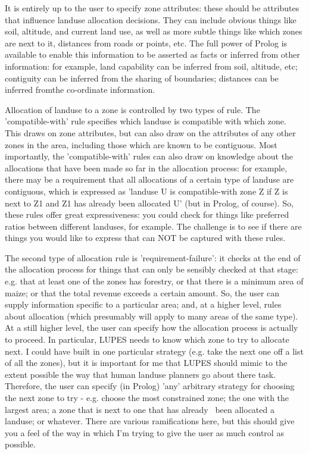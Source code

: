 It is entirely up to the user to specify zone attributes: these should be
attributes that influence landuse allocation decisions.   They can include
obvious things like soil, altitude, and current land use, as well as more
subtle things like which zones are next to it, distances from roads or points,
etc.   The full power of Prolog is available to enable this information to be
asserted as facts or inferred from other information: for example, land
capability can be inferred from soil, altitude, etc; contiguity can be
inferred from the sharing of boundaries; distances can be inferred fromthe
co-ordinate information.

Allocation of landuse to a zone is controlled by two types of rule. The
'compatible-with' rule specifies which landuse is compatible with which zone.
This draws on zone attributes, but can also draw on the attributes of any
other zones in the area, including those which are known to be contiguous.
Most importantly, the 'compatible-with' rules can also draw on knowledge about
the allocations that have been made so far in the allocation process: for
example, there may be a requirement that all allocations of a certain type of
landuse are contiguous, which is expressed as 'landuse U is compatible-with
zone Z if Z is next to Z1 and Z1 has already been allocated U' (but in Prolog,
of course).   So, these rules offer great expressiveness: you could check for
things like preferred ratios between different landuses, for example. The
challenge is to see if there are things you would like to express that can NOT
be captured with these rules.

The second type of allocation rule is 'requirement-failure': it checks at the
end of the allocation process for things that can only be sensibly checked at
that stage: e.g. that at least one of the zones has forestry, or that there is
a minimum area of maize; or that the total revenue exceeds a certain amount.
So, the user can supply information specific to a particular area; and, at a
higher level, rules about allocation (which presumably will apply to many
areas of the same type).   At a still higher level, the user can specify how
the allocation process is actually to proceed.   In particular, LUPES needs to
know which zone to try to allocate next.   I could have built in one
particular strategy (e.g. take the next one off a list of all the zones), but
it is important for me that LUPES should mimic to the extent possible the way
that human landuse planners go about there task. Therefore, the user can
specify (in Prolog) 'any' arbitrary strategy for choosing the next zone to try
- e.g. choose the most constrained zone; the one with the largest area; a zone
that is next to one that has already  \ been allocated a landuse; or whatever.
There are various ramifications here, but this should give you a feel of the
way in which I'm trying to give the user as much control as possible.

